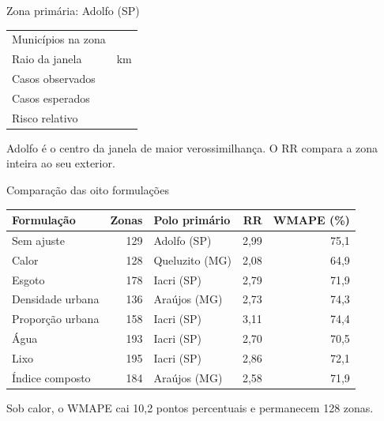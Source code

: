 \documentclass[aspectratio=169,11pt]{beamer}
\newcommand{\fonte}[1]{\par\vspace{0.15cm}{\fontsize{7}{9}\selectfont\color{cinza}#1\par}}
\begin{document}
\begin{frame}{Zona primária: Adolfo (SP)}
\begin{tabularx}{\textwidth}{@{}Xr@{}}\toprule
Municípios na zona & \ScanPrimMunicipios{}\\
Raio da janela & \ScanPrimRaioKm{} km\\
Casos observados & \ScanPrimCasosObs{}\\
Casos esperados & \ScanPrimCasosEsp{}\\
Risco relativo & \ScanPrimRR{}\\\bottomrule
\end{tabularx}\par\vspace{0.25cm}\noindent Adolfo é o centro da janela de maior verossimilhança.
\medskip O RR compara a zona inteira ao seu exterior.
\end{frame}

\begin{frame}{Comparação das oito formulações}
\small
\begin{tabularx}{\textwidth}{@{}Xrlrr@{}}\toprule
Formulação & Zonas & Polo primário & RR & WMAPE (\%)\\\midrule
Sem ajuste &129&Adolfo (SP)&2,99&75,1\\
Calor &128&Queluzito (MG)&2,08&64,9\\
Esgoto &178&Iacri (SP)&2,79&71,9\\
Densidade urbana &136&Araújos (MG)&2,73&74,3\\
Proporção urbana &158&Iacri (SP)&3,11&74,4\\
Água &193&Iacri (SP)&2,70&70,5\\
Lixo &195&Iacri (SP)&2,86&72,1\\
Índice composto &184&Araújos (MG)&2,58&71,9\\\bottomrule
\end{tabularx}\par\vspace{0.25cm}\noindent\normalsize Sob calor, o WMAPE cai 10,2 pontos percentuais e permanecem 128 zonas.
\end{frame}
\end{document}

